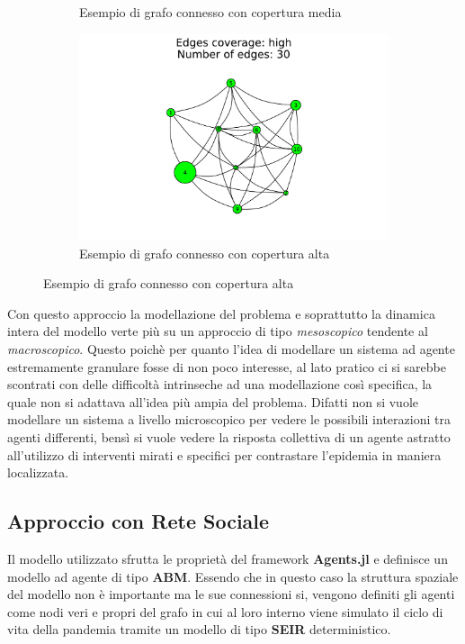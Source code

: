 \begin{figure}[!hb]
\begin{subfigure}[b]{0.3\textwidth}
		\caption{Esempio di grafo connesso con copertura media}
		\label{fig:connected_graph_example_medium}
	\end{subfigure}
	\hfill
	\begin{subfigure}[b]{0.3\textwidth}
		\centering
		\includegraphics[width=\textwidth]{img/high.pdf}
		\caption{Esempio di grafo connesso con copertura alta}
		\label{fig:connected_graph_example_high}
	\end{subfigure}
\end{figure}

Con questo approccio la modellazione del problema e soprattutto la dinamica intera del 
modello verte più su un approccio di tipo \emph{mesoscopico} tendente al \emph{macroscopico}.
Questo poichè per quanto l'idea di modellare un sistema ad agente estremamente granulare fosse 
di non poco interesse, al lato pratico ci si sarebbe scontrati con delle difficoltà 
intrinseche ad una modellazione così specifica, la quale non si adattava all'idea più 
ampia del problema. Difatti non si vuole modellare un sistema a livello microscopico per vedere
le possibili interazioni tra agenti differenti, bensì si vuole vedere la risposta collettiva di un
agente astratto all'utilizzo di interventi mirati e specifici per contrastare l'epidemia in 
maniera localizzata.

\subsection{Approccio con Rete Sociale}
Il modello utilizzato sfrutta le proprietà del framework \textbf{Agents.jl} e definisce un 
modello ad agente di tipo \textbf{ABM}. Essendo che in questo caso la struttura spaziale 
del modello non è importante ma le sue connessioni si, vengono definiti gli agenti come nodi
veri e propri del grafo in cui al loro interno viene simulato il ciclo di vita della pandemia 
tramite un modello di tipo \textbf{SEIR} deterministico.


